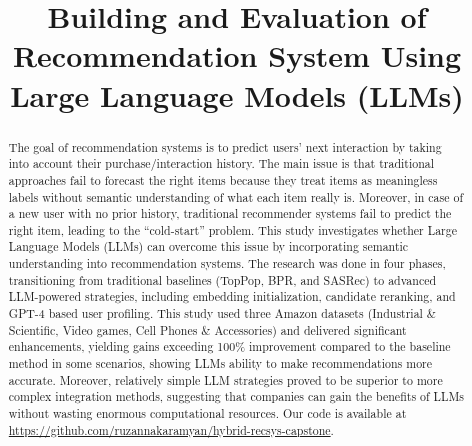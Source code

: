 \documentclass[conference]{IEEEtran}
\begin{document}
\title{Building and Evaluation of Recommendation System Using
Large Language Models (LLMs)\\

}

\author{
  \and
}
\maketitle

\begin{abstract}

The goal of recommendation systems is to predict users’ next interaction by taking into account their purchase/interaction history. The main issue is that traditional approaches fail to forecast the right items because they treat items as meaningless labels without semantic understanding of what each item really is. Moreover, in case of a new user with no prior history, traditional recommender systems fail to predict the right item, leading to the “cold-start” problem. This study investigates whether Large Language Models (LLMs) can overcome this issue by incorporating semantic understanding into recommendation systems. The research was done in four phases, transitioning from traditional baselines (TopPop, BPR, and SASRec) to advanced LLM-powered strategies, including embedding initialization, candidate reranking, and GPT-4 based user profiling.  This study used three Amazon datasets (Industrial \& Scientific, Video games, Cell Phones \& Accessories) and delivered significant enhancements, yielding gains exceeding 100\% improvement compared to the baseline method in some scenarios, showing LLMs ability to make recommendations more accurate. Moreover, relatively simple LLM strategies proved to be superior to more complex integration methods, suggesting that companies can gain the benefits of LLMs without wasting enormous computational resources. Our code is available at \url{https://github.com/ruzannakaramyan/hybrid-recsys-capstone}.

\end{abstract}
\end{document}
